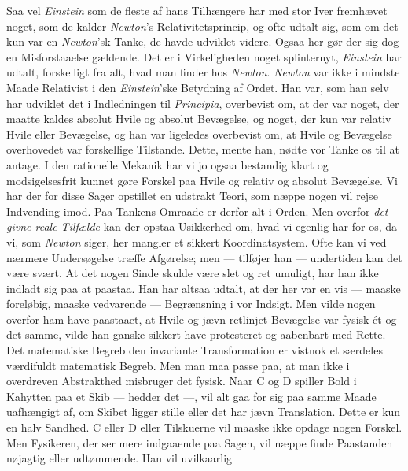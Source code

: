\documentclass[12pt,a4paper]{article}
\newcommand{\opage}[1]{\marginnote{\footnotesize\textit{[#1]}}}
\begin{document}
Saa vel \emph{Einstein} som de fleste af hans Tilhængere har med stor Iver
fremhævet noget, som de kalder \emph{Newton}'s \guillemotleft
Relativitetsprincip\guillemotright, og ofte udtalt sig, som om det kun var
en \emph{Newton}'sk Tanke, de havde udviklet videre. Ogsaa her gør der sig
dog en Misforstaaelse gældende. Det er i Virkeligheden noget splinternyt,
\emph{Einstein} har udtalt, forskelligt fra alt, hvad man finder hos
\emph{Newton}. \emph{Newton} var ikke i mindste Maade Relativist i den
\emph{Einstein}'ske Betydning af Ordet. Han var, som han selv har udviklet
det i Indledningen til \emph{Principia}, overbevist om, at der var noget,
der maatte kaldes absolut Hvile og absolut Bevægelse, og noget, der kun var
relativ Hvile eller Bevægelse, og han var ligeledes overbevist om, at Hvile
og Bevægelse overhovedet var forskellige Tilstande. Dette, mente han, nødte
vor Tanke os til at antage. I den rationelle Mekanik har vi jo ogsaa
bestandig klart og modsigelsesfrit kunnet gøre Forskel paa Hvile og relativ
og absolut Bevægelse. Vi har der for disse Sager opstillet en udstrakt
Teori, som næppe nogen vil rejse Indvending imod. Paa Tankens Omraade er
derfor alt i Orden. Men overfor \emph{det givne reale Tilfælde} kan der
opstaa Usikkerhed om, hvad vi egenlig har for os, da vi,
\opage{18} som \emph{Newton} siger, her mangler et sikkert Koordinatsystem. Ofte kan
vi ved nærmere Undersøgelse træffe Afgørelse; men --- tilføjer han ---
undertiden kan det være \guillemotleft svært\guillemotright. At det nogen
Sinde skulde være slet og ret umuligt, har han ikke indladt sig paa at
paastaa. Han har altsaa udtalt, at der her var en vis --- maaske
foreløbig, maaske vedvarende --- Begrænsning i vor Indsigt. Men vilde
nogen overfor ham have paastaaet, at Hvile og jævn retlinjet Bevægelse var
fysisk ét og det samme, vilde han ganske sikkert have protesteret og
aabenbart med Rette. Det matematiske Begreb \guillemotleft den invariante
Transformation\guillemotright{} er vistnok et særdeles værdifuldt
matematisk Begreb. Men man maa passe paa, at man ikke i overdreven
Abstrakthed misbruger det fysisk. Naar C og D spiller Bold i Kahytten paa
et Skib --- hedder det ---, vil alt gaa for sig paa samme Maade
uafhængigt af, om Skibet ligger stille eller det har jævn Translation.
Dette er kun en halv Sandhed. C eller D eller Tilskuerne vil maaske ikke
opdage nogen Forskel. Men Fysikeren, der ser mere indgaaende paa Sagen, vil
næppe finde Paastanden nøjagtig eller udtømmende. Han vil uvilkaarlig
\end{document}
